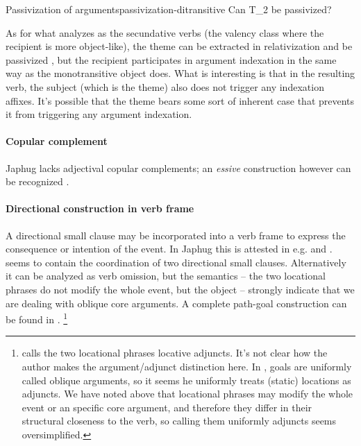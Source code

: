 \documentclass[a4paper, oneside, 12pt]{report}
\newcommand*{\citesec}[1]{\S~{#1}}
\newcommand*{\citepage}[1]{p.~{#1}}
\newcommand*{\citepages}[1]{pp.~{#1}}
\newcommand*{\term}[1]{\emph{#1}}
\begin{document}
\begin{todobox}{Passivization of arguments}{passivization-ditransitive}
    Can T_2 be passivized?
\end{todobox}

As for what \citet[\citesec{14.4.2}]{jacques2021grammar} analyzes as 
the secundative verbs (the valency class where the recipient is more object-like),
the theme can be extracted in relativization \citep[\citepages{581}]{jacques2021grammar}
and be passivized \citep[\citesec{18.1.4}]{jacques2021grammar},
but the recipient participates in argument indexation
in the same way as the monotransitive object does.
What is interesting is that in the resulting verb,
the subject (which is the theme) also does not trigger any indexation affixes.
It's possible that the theme bears some sort of inherent case 
that prevents it from triggering any argument indexation. 

\paragraph*{Copular complement}
Japhug lacks adjectival copular complements;
an \term{essive} construction however can be recognized
\citep[\citesec{8.1.7}]{jacques2021grammar}.

\paragraph*{Directional construction in verb frame}

A directional small clause may be incorporated into a verb frame 
to express the consequence or intention of the event.
In Japhug this is attested in e.g. \citet[\citepage{324}, (101)]{jacques2021grammar}
and \citet[\citepage{407}, (132)]{jacques2021grammar}.
\citet[\citepage{407}, (132)]{jacques2021grammar} seems to 
contain the coordination of two directional small clauses.
Alternatively it can be analyzed as verb omission,
but the semantics -- the two locational phrases do not modify the whole event,
but the object -- strongly indicate that we are dealing with oblique core arguments.
A complete path-goal construction can be found in \citet[\citepage{751}, (115)]{jacques2021grammar}.%
\footnote{
    \citet[\citepage{407}]{jacques2021grammar} calls the two locational phrases locative adjuncts.
    It's not clear how the author makes the argument/adjunct distinction here.
    In \citet[\citesec{22.1.2.2}]{jacques2021grammar},
    goals are uniformly called oblique arguments,
    so it seems he uniformly treats (static) locations as adjuncts.
    We have noted above that locational phrases may modify the whole event
    or an specific core argument,
    and therefore they differ in their structural closeness to the verb,
    so calling them uniformly adjuncts seems oversimplified. 
}
\end{document}
